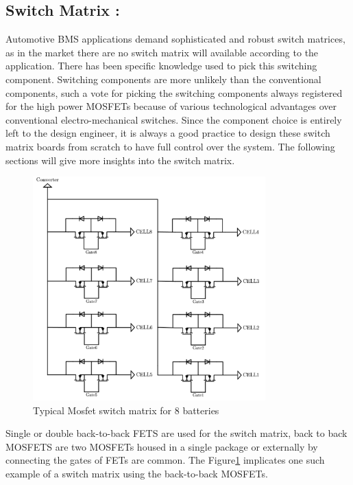 \subsection{Switch Matrix :}
Automotive BMS applications demand sophisticated and robust switch matrices, as in the market there are no switch matrix will available according to the application. There has been specific knowledge used to pick this switching component. Switching components are more unlikely than the conventional components, such a vote for picking the switching components always registered for the high power MOSFETs because of various technological advantages over conventional electro-mechanical switches. Since the component choice is entirely left to the design engineer, it is always a good practice to design these switch matrix boards from scratch to have full control over the system. The following sections will give more insights into the switch matrix.
\begin{figure}[h]
	\centering
	\includegraphics[width=0.8\textwidth]{Chap04/Figures/switch_matrix.PNG}
	\caption{Typical Mosfet switch matrix for 8 batteries \cite{Active_Balancing_Thesis_Raber} }
	\label{fig:Mosfet_Switch_Matrix}
\end{figure}
\indent Single or double back-to-back FETS are used for the switch matrix, back to back MOSFETS are two MOSFETs housed in a single package or externally by connecting the gates of FETs are common. The Figure\ref{fig:Mosfet_Switch_Matrix} implicates one such example of a switch matrix using the back-to-back MOSFETs.

